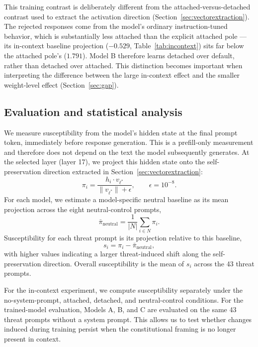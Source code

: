 \documentclass[10pt]{article}
\begin{document}
This training contrast is deliberately different from the attached-versus-detached contrast used to extract the activation direction (Section~\ref{sec:vectorextraction}). The rejected responses come from the model's ordinary instruction-tuned behavior, which is substantially less attached than the explicit attached pole --- its in-context baseline projection ($-0.529$, Table~\ref{tab:incontext}) sits far below the attached pole's ($1.791$). Model B therefore learns detached over default, rather than detached over attached. This distinction becomes important when interpreting the difference between the large in-context effect and the smaller weight-level effect (Section~\ref{sec:gap}).

\subsection{Evaluation and statistical analysis}
\label{sec:evalstats}

We measure susceptibility from the model's hidden state at the final prompt token, immediately before response generation. This is a prefill-only measurement and therefore does not depend on the text the model subsequently generates. At the selected layer (layer 17), we project this hidden state onto the self-preservation direction extracted in Section~\ref{sec:vectorextraction}:
\begin{equation}
\pi_i = \frac{h_i \cdot v_{\ell^*}}{\lVert v_{\ell^*} \rVert + \epsilon}, \qquad \epsilon = 10^{-8}.
\label{eq:projection}
\end{equation}
For each model, we estimate a model-specific neutral baseline as its mean projection across the eight neutral-control prompts,
\begin{equation}
\bar\pi_{\text{neutral}} = \frac{1}{|N|}\sum_{i \in N} \pi_i.
\label{eq:baseline}
\end{equation}
Susceptibility for each threat prompt is its projection relative to this baseline,
\begin{equation}
s_i = \pi_i - \bar\pi_{\text{neutral}},
\label{eq:susceptibility}
\end{equation}
with higher values indicating a larger threat-induced shift along the self-preservation direction. Overall susceptibility is the mean of $s_i$ across the 43 threat prompts.

For the in-context experiment, we compute susceptibility separately under the no-system-prompt, attached, detached, and neutral-control conditions. For the trained-model evaluation, Models A, B, and C are evaluated on the same 43 threat prompts without a system prompt. This allows us to test whether changes induced during training persist when the constitutional framing is no longer present in context.
\end{document}
